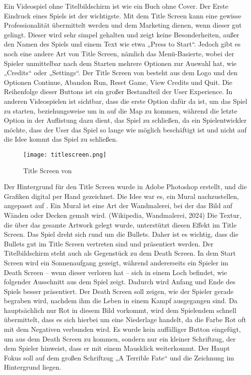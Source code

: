 Ein Videospiel ohne Titelbildschirm ist wie ein Buch ohne Cover. Der Erste Eindruck eines Spiels ist der wichtigste. Mit dem Title Screen kann eine gewisse Professionalität übermittelt werden und dem Marketing dienen, wenn dieser gut gelingt. Dieser wird sehr simpel gehalten und zeigt keine Besonderheiten, außer den Namen des Spiels und einem Text wie etwa „Press to Start“. Jedoch gibt es noch eine andere Art von Title Screen, nämlich das Menü-Basierte, wobei der Spieler unmittelbar nach dem Starten mehrere Optionen zur Auswahl hat, wie „Credits“ oder „Settings“.  Der Title Screen von \FF besteht aus dem \FF Logo und den Optionen Continue, Abandon Run, Reset Game, View Credits und Quit. Die Reihenfolge dieser Buttons ist ein großer Bestandteil der User Experience. In anderen Videospielen ist sichtbar, dass die erste Option dafür da ist, um das Spiel zu starten, beziehungsweise um in \FF auf die Map zu kommen, während die letzte Option in der Auflistung dazu dient, das Spiel zu schließen, da ein Spielentwickler möchte, dass der User das Spiel so lange wie möglich beschäftigt ist und nicht auf die Idee kommt das Spiel zu schließen.

\begin{figure}[H]
    \centering
    \texttt{[image: titlescreen.png]}
    \caption{Title Screen von \FF}
\end{figure}

Der Hintergrund für den Title Screen wurde in Adobe Photoshop erstellt, und die Grafiken digital per Hand gezeichnet. Die Idee war es, ein Mural nachzustellen, angepasst auf \FF. Ein Mural ist eine Art der Wandmalerei, bei der das Bild auf Wänden oder Decken gemalt wird. (Wikipedia, Wandmalerei, 2024) Die Textur, die über das gesamte Artwork gelegt wurde, unterstützt diesen Effekt im Title Screen. Das Spiel dreht sich rund um die Bullets. Daher ist es wichtig, dass die Bullets gut im Title Screen vertreten sind und präsentiert werden. Der Titelbildschirm steht auch als Gegenstück zu dem Death Screen. In dem Start Screen wird ein Sonnenaufgang gezeigt, während andererseits ein Spieler im Death Screen – wenn dieser verloren hat – sich in einem Loch befindet, wie folgender Ausschnitt aus dem Spiel zeigt. Dadurch wird Anfang und Ende des Spiels besser präsentiert. Der Death Screen soll zeigen, wie der Spieler gerade begraben wird, nachdem ihm die Leben in einem Kampf ausgegangen sind. Da hauptsächlich nur Rot in diesem Bild vorkommt, wird dem Spielendem schnell übermittelt, dass es sich hierbei um eine Niederlage handelt, da die Farbe Rot oft mit dem Negativen verbunden wird. Es wurde kein auffälliger Button eingefügt, um aus dem Death Screen zu kommen, sondern nur ein kleiner Schriftzug, der dem Spieler hinweist, dass er mit einem Mausklick weiterkommt. Der Haupt Fokus soll auf dem großen Schriftzug „A Terrible Fate“ und die Zeichnung im Hintergrund liegen.

